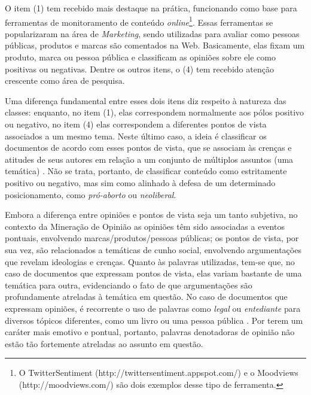 O item (1) tem recebido mais destaque na prática, funcionando como base para ferramentas de monitoramento de conteúdo \emph{online}\footnote{O TwitterSentiment (http://twittersentiment.appspot.com/) e o Moodviews (http://moodviews.com/) são dois exemplos desse tipo de ferramenta.}. Essas ferramentas se popularizaram na área de \emph{Marketing}, sendo utilizadas para avaliar como pessoas públicas, produtos e marcas são comentados na Web. Basicamente, elas fixam um produto, marca ou pessoa pública e classificam as opiniões sobre ele como positivas ou negativas. Dentre os outros itens, o (4) tem recebido  atenção crescente como área de pesquisa. %

Uma diferença fundamental entre esses dois itens diz respeito à natureza das classes: enquanto, no item (1), elas correspondem normalmente aos pólos positivo ou negativo, no item (4) elas correspondem a diferentes pontos de vista associados a um mesmo tema. Neste último caso, a ideia é classificar os documentos de acordo com esses pontos de vista, que se associam às crenças e atitudes de seus autores em relação a um conjunto de múltiplos assuntos (uma temática) \cite{omsa}. Não se trata, portanto, de classificar conteúdo como estritamente positivo ou negativo, mas sim como alinhado à defesa de um determinado posicionamento, como \emph{pró-aborto} ou \emph{neoliberal}.  

Embora a diferença entre opiniões e pontos de vista seja um tanto subjetiva, no contexto da Mineração de Opinião as opiniões têm sido associadas a eventos pontuais, envolvendo marcas/produtos/pessoas públicas; os pontos de vista, por sua vez, são relacionados a temáticas de cunho social, envolvendo argumentações que revelam ideologias e crenças. Quanto às palavras utilizadas, tem-se que, no caso de documentos que expressam pontos de vista, elas variam bastante de uma temática para outra, evidenciando o fato de que argumentações são profundamente atreladas à temática em questão. No caso de documentos que expressam opiniões, é recorrente o uso de palavras como \emph{legal} ou \emph{entediante} para diversos tópicos diferentes, como um livro ou uma pessoa pública \cite{thumbs-up}. Por terem um caráter mais emotivo e pontual, portanto, palavras denotadoras de opinião não estão tão fortemente atreladas ao assunto em questão. 

